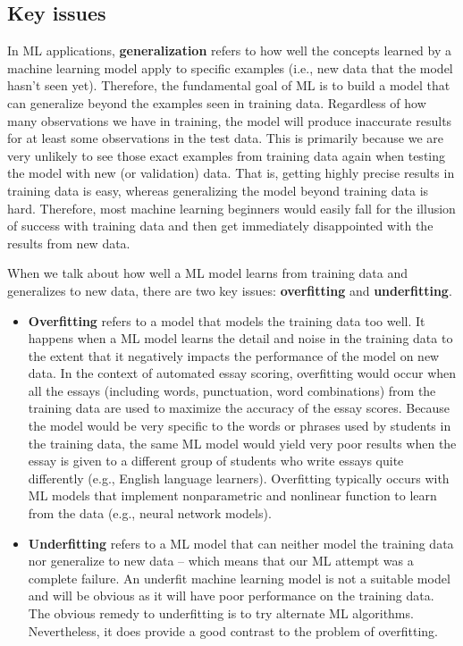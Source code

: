 \documentclass[]{book}
\begin{document}
\hypertarget{key-issues}{%
\subsection{Key issues}\label{key-issues}}

In ML applications, \textbf{generalization} refers to how well the concepts learned by a machine learning model apply to specific examples (i.e., new data that the model hasn't seen yet). Therefore, the fundamental goal of ML is to build a model that can generalize beyond the examples seen in training data. Regardless of how many observations we have in training, the model will produce inaccurate results for at least some observations in the test data. This is primarily because we are very unlikely to see those exact examples from training data again when testing the model with new (or validation) data. That is, getting highly precise results in training data is easy, whereas generalizing the model beyond training data is hard. Therefore, most machine learning beginners would easily fall for the illusion of success with training data and then get immediately disappointed with the results from new data.

When we talk about how well a ML model learns from training data and generalizes to new data, there are two key issues: \textbf{overfitting} and \textbf{underfitting}.

\begin{itemize}
\item
  \textbf{Overfitting} refers to a model that models the training data too well. It happens when a ML model learns the detail and noise in the training data to the extent that it negatively impacts the performance of the model on new data. In the context of automated essay scoring, overfitting would occur when all the essays (including words, punctuation, word combinations) from the training data are used to maximize the accuracy of the essay scores. Because the model would be very specific to the words or phrases used by students in the training data, the same ML model would yield very poor results when the essay is given to a different group of students who write essays quite differently (e.g., English language learners). Overfitting typically occurs with ML models that implement nonparametric and nonlinear function to learn from the data (e.g., neural network models).
\item
  \textbf{Underfitting} refers to a ML model that can neither model the training data nor generalize to new data -- which means that our ML attempt was a complete failure. An underfit machine learning model is not a suitable model and will be obvious as it will have poor performance on the training data. The obvious remedy to underfitting is to try alternate ML algorithms. Nevertheless, it does provide a good contrast to the problem of overfitting.
\end{itemize}
\end{document}
